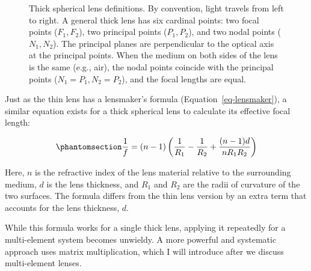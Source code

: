 \documentclass[
  letterpaper,
]{book}
\begin{document}
\begin{figure}


\caption{\label{fig-thick-cardinal}Thick spherical lens definitions. By
convention, light travels from left to right. A general thick lens has
six cardinal points: two focal points (\(F_1, F_2\)), two principal
points (\(P_1, P_2\)), and two nodal points (\(N_1, N_2\)). The
principal planes are perpendicular to the optical axis at the principal
points. When the medium on both sides of the lens is the same (e.g.,
air), the nodal points coincide with the principal points
(\(N_1=P_1, N_2=P_2\)), and the focal lengths are equal.}

\end{figure}%

Just as the thin lens has a lensmaker's formula
(Equation~\ref{eq-lensmaker}), a similar equation exists for a thick
spherical lens to calculate its effective focal length:

\begin{equation}\phantomsection\label{eq-lensmaker-thick}{
\frac{1}{f} = (n - 1) \left ( \frac{1}{R_1} - \frac{1}{R_2} + \frac{(n - 1) d}{n R_1 R_2} \right )
}\end{equation}

Here, \(n\) is the refractive index of the lens material relative to the
surrounding medium, \(d\) is the lens thickness, and \(R_1\) and \(R_2\)
are the radii of curvature of the two surfaces. The formula differs from
the thin lens version by an extra term that accounts for the lens
thickness, \(d\).

While this formula works for a single thick lens, applying it repeatedly
for a multi-element system becomes unwieldy. A more powerful and
systematic approach uses matrix multiplication, which I will introduce
after we discuss multi-element lenses.
\end{document}
